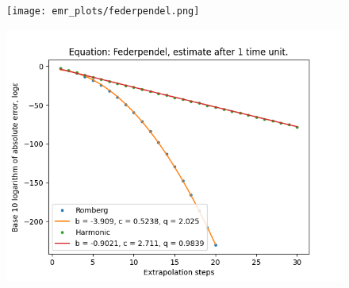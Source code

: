 \begin{figure}[H]
\centering
\begin{minipage}{0.45\textwidth}
\centering
\texttt{[image: emr\_plots/federpendel.png]}
\end{minipage}
\begin{minipage}{0.45\textwidth}
\centering
\includegraphics[scale=0.45]{emr_plots/federpendel_1_hp_steps.png}
\end{minipage}
\end{figure}

